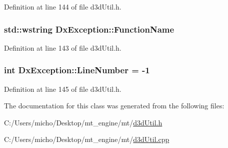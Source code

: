 Definition at line 144 of file d3d\+Util.\+h.

\subsubsection[{\texorpdfstring{Function\+Name}{FunctionName}}]{\setlength{\rightskip}{0pt plus 5cm}std\+::wstring Dx\+Exception\+::\+Function\+Name}\hypertarget{class_dx_exception_a8fa7d58ba60cc972f4eb4993dfd5bc56_a8fa7d58ba60cc972f4eb4993dfd5bc56}{}\label{class_dx_exception_a8fa7d58ba60cc972f4eb4993dfd5bc56_a8fa7d58ba60cc972f4eb4993dfd5bc56}


Definition at line 143 of file d3d\+Util.\+h.

\subsubsection[{\texorpdfstring{Line\+Number}{LineNumber}}]{\setlength{\rightskip}{0pt plus 5cm}int Dx\+Exception\+::\+Line\+Number = -\/1}\hypertarget{class_dx_exception_aee30e6d56dfd40d6a73852503ebd8b7f_aee30e6d56dfd40d6a73852503ebd8b7f}{}\label{class_dx_exception_aee30e6d56dfd40d6a73852503ebd8b7f_aee30e6d56dfd40d6a73852503ebd8b7f}


Definition at line 145 of file d3d\+Util.\+h.



The documentation for this class was generated from the following files\+:\begin{DoxyCompactItemize}
\item 
C\+:/\+Users/micho/\+Desktop/mt\+\_\+engine/mt/\hyperlink{d3d_util_8h}{d3d\+Util.\+h}\item 
C\+:/\+Users/micho/\+Desktop/mt\+\_\+engine/mt/\hyperlink{d3d_util_8cpp}{d3d\+Util.\+cpp}\end{DoxyCompactItemize}
